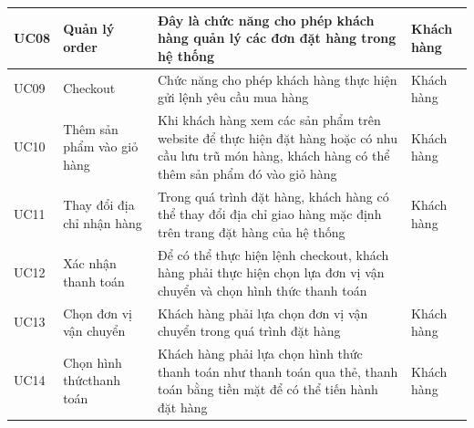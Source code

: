\documentclass[12pt,a4paper,2sides]{report}
\begin{document}
\begin{tabular}{|p{1cm}|p{3cm}|p{6cm}|p{3cm}|} 
\hline
UC08 & Quản lý order                          & Đây là chức năng cho phép khách hàng quản lý các đơn đặt hàng trong hệ thống                                                                                                                                                             & Khách hàng                                                              \\ 
\hline
UC09 & Checkout                               & Chức năng cho phép khách hàng thực hiện gửi lệnh yêu cầu mua hàng                                                                                                                                                                        & Khách hàng                                                              \\ 
\hline
UC10 & Thêm sản phẩm vào giỏ hàng             & Khi khách hàng xem các sản phẩm trên website để thực hiện đặt hàng hoặc có nhu cầu lưu trũ món hàng, khách hàng có thể thêm sản phẩm đó vào giỏ hàng                                                                                     & Khách hàng                                                              \\ 
\hline
UC11 & Thay đổi địa chỉ nhận hàng             & Trong quá trình đặt hàng, khách hàng có thể thay đổi địa chỉ giao hàng mặc định trên trang đặt hàng của hệ thống                                                                                                                         & Khách hàng                                                              \\ 
\hline
UC12 & Xác nhận thanh toán                    & Để có thể thực hiện lệnh checkout, khách hàng phải thực hiện chọn lựa đơn vị vận chuyển và chọn hình thức thanh toán                                                                                                                     &                                                                         \\ 
\hline
UC13 & Chọn đơn vị vận chuyển                 & Khách hàng phải lựa chọn đơn vị vận chuyển trong quá trình đặt hàng                                                                                                                                                                      & Khách hàng                                                              \\ 
\hline
UC14 & Chọn hình thứcthanh toán               & Khách hàng phải lựa chọn hình thức thanh toán như thanh toán qua thẻ, thanh toán bằng tiền mặt để có thể tiến hành đặt hàng~                                                                                                             & Khách hàng                                                              \\ 

\end{tabular}
\end{document}
